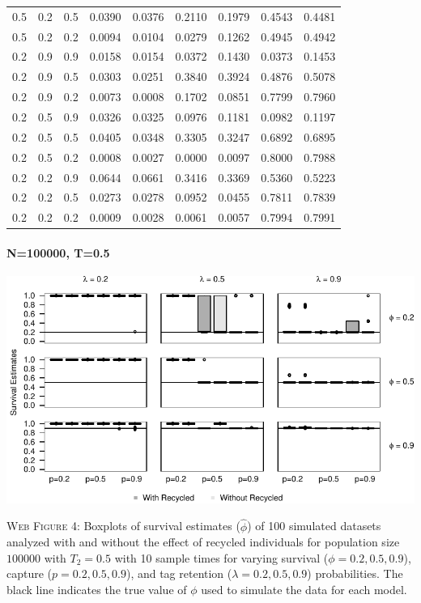 \documentclass[]{article}
\let\oldparagraph\paragraph
\renewcommand{\paragraph}[1]{\oldparagraph{#1}\mbox{}}
\begin{document}
\begin{table}[ht]
{\begin{tabular}{rrrrrrrrr}
  0.5 & 0.2 & 0.5 & 0.0390 & 0.0376 & 0.2110 & 0.1979 & 0.4543 & 0.4481 \\ 
  0.5 & 0.2 & 0.2 & 0.0094 & 0.0104 & 0.0279 & 0.1262 & 0.4945 & 0.4942 \\ 
  0.2 & 0.9 & 0.9 & 0.0158 & 0.0154 & 0.0372 & 0.1430 & 0.0373 & 0.1453 \\ 
  0.2 & 0.9 & 0.5 & 0.0303 & 0.0251 & 0.3840 & 0.3924 & 0.4876 & 0.5078 \\ 
  0.2 & 0.9 & 0.2 & 0.0073 & 0.0008 & 0.1702 & 0.0851 & 0.7799 & 0.7960 \\ 
  0.2 & 0.5 & 0.9 & 0.0326 & 0.0325 & 0.0976 & 0.1181 & 0.0982 & 0.1197 \\ 
  0.2 & 0.5 & 0.5 & 0.0405 & 0.0348 & 0.3305 & 0.3247 & 0.6892 & 0.6895 \\ 
  0.2 & 0.5 & 0.2 & 0.0008 & 0.0027 & 0.0000 & 0.0097 & 0.8000 & 0.7988 \\ 
  0.2 & 0.2 & 0.9 & 0.0644 & 0.0661 & 0.3416 & 0.3369 & 0.5360 & 0.5223 \\ 
  0.2 & 0.2 & 0.5 & 0.0273 & 0.0278 & 0.0952 & 0.0455 & 0.7811 & 0.7839 \\ 
  0.2 & 0.2 & 0.2 & 0.0009 & 0.0028 & 0.0061 & 0.0057 & 0.7994 & 0.7991 \\ 
   \hline
\end{tabular}
}
\endgroup
\end{table}

\newpage

\paragraph{N=100000, T=0.5}\label{n100000-t0.5}

\includegraphics{Appendix_BW_files/figure-latex/figure4_survival_GJSTL3-1.pdf}

\textsc{Web Figure 4:} Boxplots of survival estimates (\(\hat{\phi}\))
of 100 simulated datasets analyzed with and without the effect of
recycled individuals for population size \(100000\) with \(T_2=0.5\)
with 10 sample times for varying survival (\(\phi=0.2,0.5,0.9\)),
capture (\(p=0.2,0.5,0.9\)), and tag retention (\(\lambda=0.2,0.5,0.9\))
probabilities. The black line indicates the true value of \(\phi\) used
to simulate the data for each model.
\end{document}
